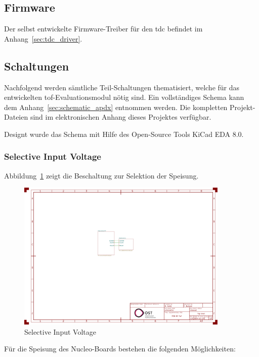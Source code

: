 \subsection{Firmware}

Der selbst entwickelte Firmware-Treiber für den \acrshort{tdc} befindet im Anhang~\ref{sec:tdc_driver}.

\pagebreak

\subsection{Schaltungen}
Nachfolgend werden sämtliche Teil-Schaltungen thematisiert, welche für das entwickelten \acrshort{tof}-Evaluationsmodul
nötig sind. Ein vollständiges Schema kann dem Anhang~\ref{sec:schematic_apdx} entnommen werden. Die kompletten
Projekt-Dateien sind im elektronischen Anhang dieses Projektes verfügbar.

Designt wurde das Schema mit Hilfe des Open-Source Tools \dq KiCad EDA 8.0\dq.

\subsubsection{Selective Input Voltage}

Abbildung~\ref{fig:selective_input_voltage} zeigt die Beschaltung zur Selektion der Speisung.

\begin{figure}[H]
    \centering
    \includegraphics[page=2, trim=80 590 750 50, clip, width=0.9\textwidth]{attachments/schematic.pdf}
    \caption{Selective Input Voltage}\label{fig:selective_input_voltage}
\end{figure}

Für die Speisung des Nucleo-Boards bestehen die folgenden Möglichkeiten:


